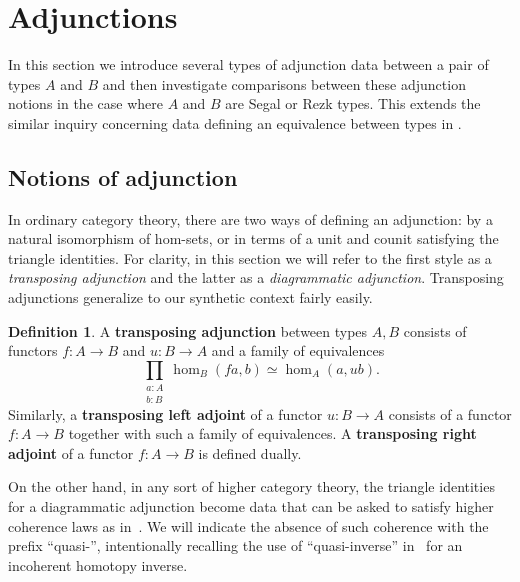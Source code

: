 \documentclass{amsart}
\theoremstyle{plain}
\theoremstyle{definition}
\newtheorem{defn}[thm]{Definition}
\theoremstyle{remark}
\numberwithin{equation}{section}
\begin{document}
\section{Adjunctions}
\label{sec:adjunctions}

In this section we introduce several types of adjunction data between a pair of types $A$ and $B$ and then investigate comparisons between these adjunction notions in the case where $A$ and $B$ are Segal or Rezk types. This extends the similar inquiry concerning data defining an equivalence between types in \cite[Chapter 4]{hottbook}.

\subsection{Notions of adjunction}
\label{sec:notions-adjunction}

In ordinary category theory, there are two ways of defining an adjunction: by a natural isomorphism of hom-sets, or in terms of a unit and counit satisfying the triangle identities.
For clarity, in this section we will refer to the first style as a \emph{transposing adjunction} and the latter as a \emph{diagrammatic adjunction}.
Transposing adjunctions generalize to our synthetic context fairly easily.

\begin{defn}
  A \textbf{transposing adjunction} between types $A,B$ consists of functors $f:A\to B$ and $u:B\to A$ and a family of equivalences
  \[ \prod_{\substack{a:A\\ b:B}} \hom_B(fa,b) \simeq \hom_A(a,ub). \]
  Similarly, a \textbf{transposing left adjoint} of a functor $u:B\to A$ consists of a functor $f:A\to B$ together with such a family of equivalences. A \textbf{transposing right adjoint} of a functor $f \colon A \to B$ is defined dually.
\end{defn}

On the other hand, in any sort of higher category theory, the triangle identities for a diagrammatic adjunction become data that can be asked to satisfy higher coherence laws as in~\cite{RVadj}.
We will indicate the absence of such coherence with the prefix ``quasi-'', intentionally recalling the use of ``quasi-inverse'' in~\cite{hottbook} for an incoherent homotopy inverse.
\end{document}
